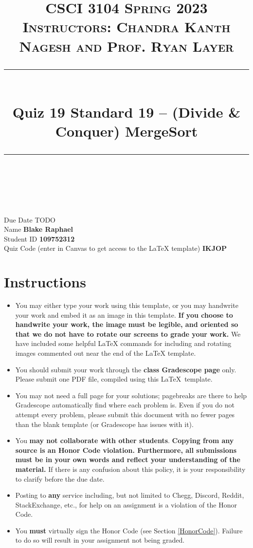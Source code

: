 \documentclass[11pt]{article}
\title{
\normalfont \normalsize 
\textsc{CSCI 3104 Spring 2023 \\ 
Instructors: Chandra Kanth Nagesh and Prof. Ryan Layer} \\
[10pt] 
\rule{\linewidth}{0.5pt} \\[6pt] 
\huge Quiz 19 Standard 19 -- (Divide \& Conquer) MergeSort \\
\rule{\linewidth}{2pt}  \\[10pt]
}
\date{}
\theoremstyle{definition}
\theoremstyle{definition}
\theoremstyle{definition}
\begin{document}

\maketitle


\noindent
Due Date \dotfill TODO \\
Name \dotfill \textbf{Blake Raphael} \\
Student ID \dotfill \textbf{109752312} \\
Quiz Code (enter in Canvas to get access to the LaTeX template) \dotfill \textbf{IKJOP}


\tableofcontents

\section*{Instructions}
 \begin{itemize}
	\item You may either type your work using this template, or you may handwrite your work and embed it as an image in this template. \textbf{If you choose to handwrite your work, the image must be legible, and oriented so that we do not have to rotate our screens to grade your work.} We have included some helpful LaTeX commands for including and rotating images commented out near the end of the LaTeX template.
	\item You should submit your work through the \textbf{class Gradescope page} only. Please submit one PDF file, compiled using this \LaTeX \ template.
	\item You may not need a full page for your solutions; pagebreaks are there to help Gradescope automatically find where each problem is. Even if you do not attempt every problem, please submit this document with no fewer pages than the blank template (or Gradescope has issues with it).

	\item You \textbf{may not collaborate with other students}. \textbf{Copying from any source is an Honor Code violation. Furthermore, all submissions must be in your own words and reflect your understanding of the material.} If there is any confusion about this policy, it is your responsibility to clarify before the due date. 

	\item Posting to \textbf{any} service including, but not limited to Chegg, Discord, Reddit, StackExchange, etc., for help on an assignment is a violation of the Honor Code.

	\item You \textbf{must} virtually sign the Honor Code (see Section \ref{HonorCode}). Failure to do so will result in your assignment not being graded.
\end{itemize}
\end{document}
